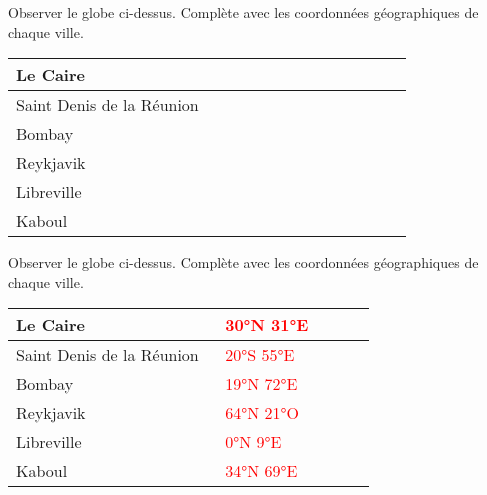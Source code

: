 \begin{exercice*}
    Observer le globe ci-dessus. Complète avec les coordonnées géographiques de chaque ville.

    {\renewcommand{\arraystretch}{1.2}
        \begin{tabular}{|>{\centering\arraybackslash}m{0.5\linewidth}|>{\centering\arraybackslash}m{0.4\linewidth}|}
            \hline
            \cellcolor{LightGray}Le Caire &\\\hline
            \cellcolor{LightGray}Saint Denis de la Réunion &\\\hline
            \cellcolor{LightGray}Bombay &\\\hline
            \cellcolor{LightGray}Reykjavik &\\\hline
            \cellcolor{LightGray}Libreville &\\\hline
            \cellcolor{LightGray}Kaboul &\\\hline        
        \end{tabular}
    }
\end{exercice*}
\begin{corrige}
    Observer le globe ci-dessus. Complète avec les coordonnées géographiques de chaque ville.

    \hspace*{-8mm}
    {\renewcommand{\arraystretch}{1.2}
        \begin{tabular}{|>{\centering\arraybackslash}m{0.55\linewidth}|>{\centering\arraybackslash}m{0.4\linewidth}|}
            \hline
            \cellcolor{LightGray}Le Caire &\textcolor{red}{\ang{30}N \ang{31}E}\\\hline
            \cellcolor{LightGray}Saint Denis de la Réunion &\textcolor{red}{\ang{20}S \ang{55}E}\\\hline
            \cellcolor{LightGray}Bombay &\textcolor{red}{\ang{19}N \ang{72}E}\\\hline
            \cellcolor{LightGray}Reykjavik &\textcolor{red}{\ang{64}N \ang{21}O}\\\hline
            \cellcolor{LightGray}Libreville &\textcolor{red}{\ang{0}N \ang{9}E}\\\hline
            \cellcolor{LightGray}Kaboul &\textcolor{red}{\ang{34}N \ang{69}E}\\\hline        
        \end{tabular}
    }
\end{corrige}
